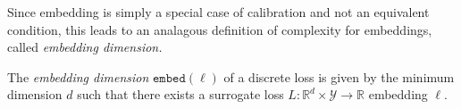 \documentclass[anon,12pt]{colt2021} %
\newcommand{\reals}{\mathbb{R}}
\newcommand{\simplex}{\Delta_\Y}
\newcommand{\embed}{\mathtt{embed}}
\newcommand{\R}{\mathcal{R}}
\newcommand{\Y}{\mathcal{Y}}
\newcommand{\toto}{\rightrightarrows}
\begin{document}
Since embedding is simply a special case of calibration and not an equivalent condition, this leads to an analagous definition of complexity for embeddings, called \emph{embedding dimension.}

\begin{definition}
	The \emph{embedding dimension} $\embed(\ell)$ of a discrete loss is given by the minimum dimension $d$ such that there exists a surrogate loss $L : \reals^d \times \Y \to \reals$ embedding $\ell$.
\end{definition}


\end{document}

